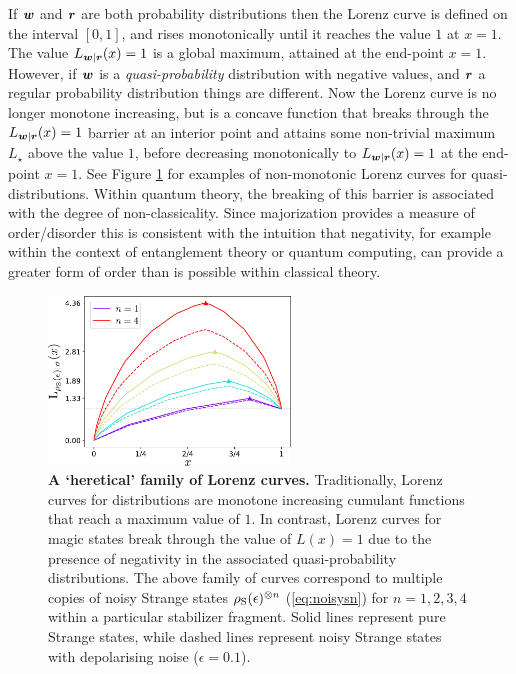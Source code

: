 \documentclass[pra,
aps,
twocolumn,
superscriptaddress,
groupedaddress,
nofootinbib,
reprint
]{revtex4-1}
\begin{document}
If $\boldsymbol{w}$ and $\boldsymbol{r}$ are both probability distributions then the Lorenz curve is defined on the interval $[0,1]$, and rises monotonically until it reaches the value $1$ at $x=1$. The value $L_{\boldsymbol{w}|\boldsymbol{r}}(x) = 1$ is a global maximum, attained at the end-point $x=1$. However, if $\boldsymbol{w}$ is a \emph{quasi-probability} distribution with negative values, and $\boldsymbol{r}$ a regular probability distribution things are different. Now the Lorenz curve is no longer monotone increasing, but is a concave function that breaks through the $L_{\boldsymbol{w}|\boldsymbol{r}}(x) = 1$ barrier at an interior point and attains some non-trivial maximum $L_\star$ above the value $1$, before decreasing monotonically to $L_{\boldsymbol{w}|\boldsymbol{r}}(x)= 1$ at the end-point $x=1$. See Figure \ref{fig:lcs} for examples of non-monotonic Lorenz curves for quasi-distributions. Within quantum theory, the breaking of this barrier is associated with the degree of non-classicality. Since majorization provides a measure of order/disorder this is consistent with the intuition that negativity, for example within the context of entanglement theory or quantum computing, can provide a greater form of order than is possible within classical theory.

\begin{figure}
    \centering
    \includegraphics[height=4.5cm]{figs/lc_Strange.pdf}
    \caption{\textbf{A `heretical' family of Lorenz curves.} Traditionally, Lorenz curves for distributions are monotone increasing cumulant functions that reach a maximum value of $1$. In contrast, Lorenz curves for magic states break through the value of $L(x)=1$ due to the presence of negativity in the associated quasi-probability distributions. The above family of curves correspond to multiple copies of noisy Strange states $\rho_{\rm{S}}(\epsilon)^{\otimes n}$ (\cref{eq:noisysn}) for $n=1,2,3,4$ within a particular stabilizer fragment. Solid lines represent pure Strange states, while dashed lines represent noisy Strange states with depolarising noise ($\epsilon = 0.1$).
    }
    \label{fig:lcs}
\end{figure}
\end{document}
